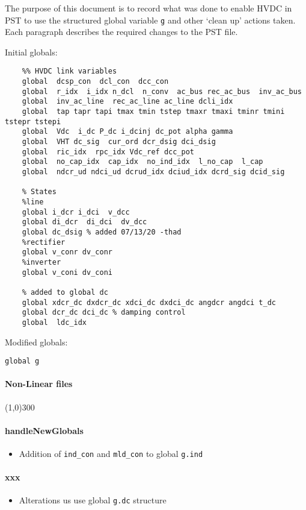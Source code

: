 \documentclass[12pt]{article}
\begin{document}
The purpose of this document is to record what was done to enable HVDC in PST to use the structured global variable \verb|g| and other `clean up' actions taken. \\
Each paragraph describes the required changes to the PST file.

Initial globals:
\begin{verbatim}
    %% HVDC link variables 
    global  dcsp_con  dcl_con  dcc_con
    global  r_idx  i_idx n_dcl  n_conv  ac_bus rec_ac_bus  inv_ac_bus
    global  inv_ac_line  rec_ac_line ac_line dcli_idx
    global  tap tapr tapi tmax tmin tstep tmaxr tmaxi tminr tmini tstepr tstepi
    global  Vdc  i_dc P_dc i_dcinj dc_pot alpha gamma 
    global  VHT dc_sig  cur_ord dcr_dsig dci_dsig
    global  ric_idx  rpc_idx Vdc_ref dcc_pot
    global  no_cap_idx  cap_idx  no_ind_idx  l_no_cap  l_cap
    global  ndcr_ud ndci_ud dcrud_idx dciud_idx dcrd_sig dcid_sig

    % States
    %line
    global i_dcr i_dci  v_dcc
    global di_dcr  di_dci  dv_dcc
    global dc_dsig % added 07/13/20 -thad
    %rectifier
    global v_conr dv_conr
    %inverter
    global v_coni dv_coni
    
    % added to global dc
    global xdcr_dc dxdcr_dc xdci_dc dxdci_dc angdcr angdci t_dc
    global dcr_dc dci_dc % damping control
    global  ldc_idx
\end{verbatim}

Modified globals:
\begin{verbatim}
global g
\end{verbatim}
\paragraph{Non-Linear files}\line(1,0){300}
\paragraph{handleNewGlobals}
	\begin{itemize}
		\item Addition of \verb|ind_con| and \verb|mld_con| to global \verb|g.ind|
	\end{itemize}
\paragraph{xxx}
	\begin{itemize}
		\item Alterations us use global \verb|g.dc| structure
	\end{itemize}
	
\end{document}
